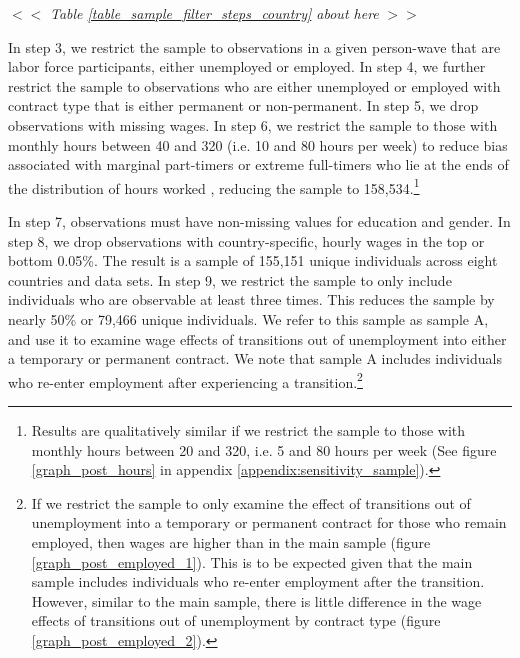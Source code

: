 \documentclass[12pt]{article}
\begin{document}
\begin{center}
$<<$ \emph{Table \ref{table_sample_filter_steps_country} about here} $>>$
\end{center}


In step 3, we restrict the sample to observations in a given person-wave that are labor force participants, either unemployed or employed.  In step 4, we further restrict the sample to observations who are either unemployed or employed with contract type that is either permanent or non-permanent.  In step 5, we drop observations with missing wages.  In step 6, we restrict the sample to those with monthly hours between 40 and 320 (i.e. 10 and 80 hours per week) to reduce bias associated with marginal part-timers or extreme full-timers who lie at the ends of the distribution of hours worked \citep{barbieri_dual_2018}, reducing the sample to 158,534.\footnote{Results are qualitatively similar if we restrict the sample to those with monthly hours between 20 and 320, i.e. 5 and 80 hours per week (See figure \ref{graph_post_hours} in appendix \ref{appendix:sensitivity_sample}).}

In step 7, observations must have non-missing values for education and gender.  In step 8, we drop observations with country-specific, hourly wages in the top or bottom 0.05\%.  The result is a sample of 155,151 unique individuals across eight countries and data sets.  In step 9, we restrict the sample to only include individuals who are observable at least three times.  This reduces the sample by nearly 50\% or 79,466 unique individuals.  We refer to this sample as sample A, and use it to examine wage effects of transitions out of unemployment into either a temporary or permanent contract.  We note that sample A includes individuals who re-enter employment after experiencing a transition.\footnote{If we restrict the sample to only examine the effect of transitions out of unemployment into a temporary or permanent contract for those who remain employed, then wages are higher than in the main sample (figure \ref{graph_post_employed_1}).  This is to be expected given that the main sample includes individuals who re-enter employment after the transition.  However, similar to the main sample, there is little difference in the wage effects of transitions out of unemployment by contract type (figure \ref{graph_post_employed_2}).}
\end{document}
